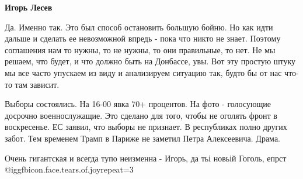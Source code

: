 \begin{itemize}
\begin{itemize}
\textbf{Игорь Лесев} 

Да. Именно так. Это был способ остановить большую бойню. Но как идти дальше и
сделать ее невозможной впредь - пока что никто не знает. Поэтому соглашения нам
то нужны, то не нужны, то они правильные, то нет. Не мы решаем, что будет, и
что должно быть на Донбассе, увы. Вот эту простую штуку мы все часто упускаем
из виду и анализируем ситуацию так, будто бы от нас что-то там зависит.

\end{itemize} %


Выборы состоялись. На 16-00 явка 70+ процентов. На фото - голосующие досрочно
военнослужащие. Это сделано для того, чтобы не оголять фронт в воскресенье. ЕС
заявил, что выборы не признает. В республиках полно других забот. Тем временем
Трамп в Париже не заметил Петра Алексеевича. Драма.

Очень гигантская и всегда тупо неизменна - Игорь, да тьі новьій Гоголь, епрст @igg{fbicon.face.tears.of.joy}{repeat=3} 

\end{itemize} %
